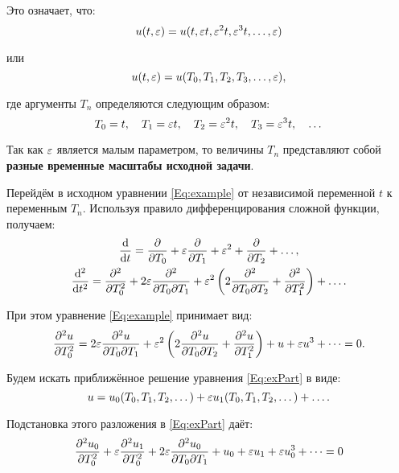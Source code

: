 Это означает, что:
\begin{equation*}
    u(t, \varepsilon) = u(t, \varepsilon t, \varepsilon^2 t, \varepsilon^3 t, \dots, \varepsilon) 
\end{equation*}

или
\begin{equation*}
    u(t, \varepsilon) = u(T_0, T_1, T_2, T_3, \dots, \varepsilon),
\end{equation*}

где аргументы $T_n$ определяются следующим образом:
\begin{equation*}
    T_0 = t, \quad T_1 = \varepsilon t, \quad T_2 = \varepsilon^2 t,
    \quad T_3 = \varepsilon^3 t, \quad \dots
\end{equation*}

Так как $\varepsilon$ является малым параметром,
то величины $T_n$ представляют собой
\textbf{разные временные масштабы исходной задачи}.

Перейдём в исходном уравнении \eqref{Eq:example}
от независимой переменной $t$ к переменным $T_n$.
Используя правило дифференцирования сложной функции, получаем:
\begin{equation*}
    \begin{gathered}
        \dv{}{t} = \pdv{}{T_0} + \varepsilon \pdv{}{T_1} +
        \varepsilon^2 + \pdv{}{T_2} + \dots, \\
        \dv[2]{}{t} = \pdv[2]{}{T_0} +
        2 \varepsilon \pdv{}{T_0}{T_1} +
        \varepsilon^2 \left( 2 \pdv{}{T_0}{T_2} + \pdv[2]{T_1}\right) + \dots. 
    \end{gathered}
\end{equation*}

При этом уравнение \eqref{Eq:example} принимает вид:
\begin{equation} \label{Eq:exPart}
    \pdv[2]{u}{T_0} = 2 \varepsilon \pdv{u}{T_0}{T_1} +
    \varepsilon^2 \left( 2 \pdv{u}{T_0}{T_2} + \pdv[2]{u}{T_1} \right) +
    u + \varepsilon u^3 + \dots = 0.
\end{equation}

Будем искать приближённое решение уравнения \eqref{Eq:exPart} в виде:
\begin{equation} \label{Eq:insertDecomp}
    u = u_0(T_0, T_1, T_2, \dots) +
    \varepsilon u_1(T_0, T_1, T_2, \dots) + \dots.
\end{equation}

Подстановка этого разложения в \eqref{Eq:exPart} даёт:
\begin{equation*}
    \pdv[2]{u_0}{T_0} + \varepsilon \pdv[2]{u_1}{T_0} +
    2 \varepsilon \pdv{u_0}{T_0}{T_1} + u_0 +
    \varepsilon u_1 + \varepsilon u_0^3 + \dots = 0
\end{equation*}

